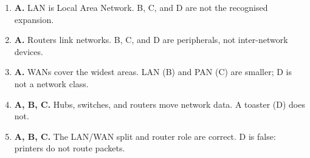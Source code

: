 \documentclass[11pt]{article}
\begin{document}
\begin{enumerate}[label=\textbf{Q\arabic*.}, leftmargin=*]
\item \textbf{A.} LAN is Local Area Network. B, C, and D are not the recognised expansion.
\item \textbf{A.} Routers link networks. B, C, and D are peripherals, not inter-network devices.
\item \textbf{A.} WANs cover the widest areas. LAN (B) and PAN (C) are smaller; D is not a network class.
\item \textbf{A, B, C.} Hubs, switches, and routers move network data. A toaster (D) does not.
\item \textbf{A, B, C.} The LAN/WAN split and router role are correct. D is false: printers do not route packets.
\end{enumerate}
\def\JKSSBLessonID{40}\def\JKSSBAnswers{1}
\end{document}
